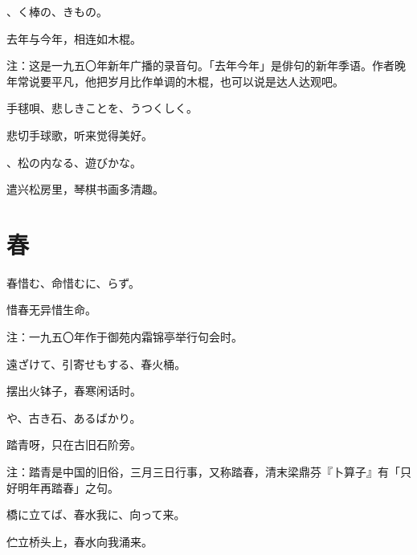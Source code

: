 \setcounter{haikucounter}{0}

\begin{haiku}
    {\FH {}、く棒の、きもの。}

    {\FK 去年与今年，相连如木棍。}

    {\FT 注：这是一九五〇年新年广播的录音句。「去年今年」是俳句的新年季语。作者晚年常说要平凡，他把岁月比作单调的木棍，也可以说是达人达观吧。}
\end{haiku}

\begin{haiku}
    {\FH 手毬唄、悲しきことを、うつくしく。}

    {\FK 悲切手球歌，听来觉得美好。}
\end{haiku}

\begin{haiku}
    {\FH {}、松の内なる、遊びかな。}

    {\FK 遣兴松房里，琴棋书画多清趣。}
\end{haiku}

\section{\FK 春}

\setcounter{haikucounter}{0}

\begin{haiku}
    {\FH 春惜む、命惜むに、らず。}

    {\FK 惜春无异惜生命。}

    {\FT 注：一九五〇年作于御苑内霜锦亭举行句会时。}
\end{haiku}

\begin{haiku}
    {\FH 遠ざけて、引寄せもする、春火桶。}

    {\FK 摆出火钵子，春寒闲话时。}
\end{haiku}

\begin{haiku}
    {\FH {}や、古き石、あるばかり。}

    {\FK 踏青呀，只在古旧石阶旁。}

    {\FT 注：踏青是中国的旧俗，三月三日行事，又称踏春，清末梁鼎芬『卜算子』有「只好明年再踏春」之句。}
\end{haiku}

\begin{haiku}
    {\FH 橋に立てば、春水我に、向って来。}

    {\FK 伫立桥头上，春水向我涌来。}
\end{haiku}

